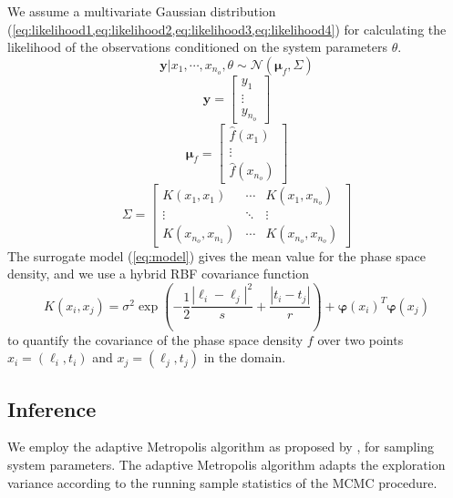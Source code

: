 We assume a multivariate Gaussian distribution 
(\cref{eq:likelihood1,eq:likelihood2,eq:likelihood3,eq:likelihood4}) for calculating the 
likelihood of the observations conditioned on the system parameters $\theta$.  
%
\begin{equation}\label{eq:likelihood1}
\mathbf{y} | x_1, \cdots, x_{n_o}, \theta \sim \mathcal{N} \left(\mathbf{\mu}_f, \Sigma \right )
\end{equation}
%
\begin{equation}\label{eq:likelihood2}
\mathbf{y} = \begin{bmatrix}
y_1\\ 
\vdots\\ 
y_{n_o}
\end{bmatrix}
\end{equation}
%
\begin{equation}\label{eq:likelihood3}
  \mathbf{\mu}_f = \begin{bmatrix}
\hat{f}(x_1)\\ 
\vdots\\ 
\hat{f}(x_{n_o})
\end{bmatrix}
\end{equation}
%
\begin{equation}\label{eq:likelihood4}
    \Sigma = \begin{bmatrix}
K(x_1, x_1) & \cdots  & K(x_1, x_{n_o})\\ 
\vdots & \ddots & \vdots\\ 
K(x_{n_o}, x_{n_{1}}) & \cdots  & K(x_{n_o}, x_{n_{o}})
\end{bmatrix}
\end{equation}
%
The surrogate model (\cref{eq:model}) gives the mean value for the phase space density, and we use 
a hybrid RBF covariance function 
\[
  K(x_{i}, x_{j}) = \sigma^2 \exp \left(
    -\frac{1}{2} \frac{|\ell_i - \ell_j|^2}{s} + \frac{|t_i - t_j|}{r}
  \right)  + \mathbf{\varphi}(x_i)^{T}\mathbf{\varphi}(x_j)
\] 
to quantify the covariance of the phase space density $f$ over two points $x_i = (\ell_i, t_i)$ and 
$x_j = (\ell_j, t_j)$ in the domain.

\subsection{Inference}

We employ the adaptive Metropolis algorithm as proposed by \citet{haario2001}, for sampling
system parameters. The adaptive Metropolis algorithm adapts the exploration variance according to 
the running sample statistics of the MCMC procedure.

